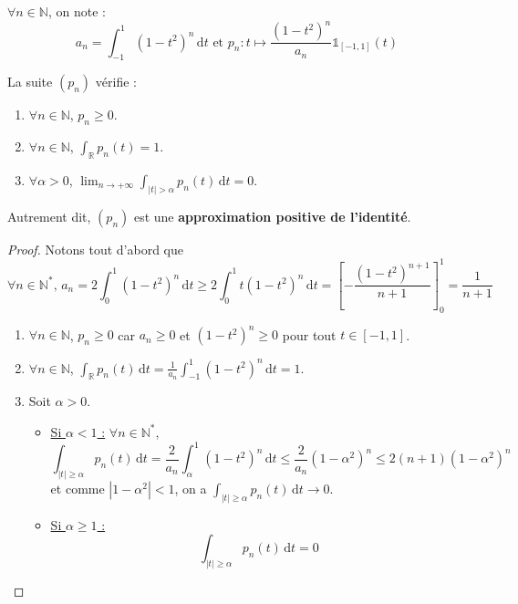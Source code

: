 






  \begin{notation}
    $\forall n \in \mathbb{N}$, on note :
    \[ a_n = \int_{-1}^1 (1-t^2)^n \, \mathrm{d}t \text{ et } p_n : t \mapsto \frac{(1-t^2)^n}{a_n} \mathbb{1}_{[-1, 1]}(t) \]
  \end{notation}

  \begin{lemma}
    \label{theoreme-de-weierstrass-par-la-convolution-1}
    La suite $(p_n)$ vérifie :
    \begin{enumerate}[label=(\roman*)]
      \item $\forall n \in \mathbb{N}$, $p_n \geq 0$.
      \item $\forall n \in \mathbb{N}$, $\int_{\mathbb{R}} p_n(t) = 1$.
      \item \label{theoreme-de-weierstrass-par-la-convolution-2} $\forall \alpha > 0$, $\lim_{n \rightarrow +\infty} \int_{|t| > \alpha} p_n(t) \, \mathrm{d}t = 0$.
    \end{enumerate}
    Autrement dit, $(p_n)$ est une \textbf{approximation positive de l'identité}.
  \end{lemma}

  \begin{proof}
    Notons tout d'abord que
    \[ \forall n \in \mathbb{N}^*, \, a_n = 2 \int_0^1 (1-t^2)^n \, \mathrm{d}t \geq 2 \int_0^1 t (1-t^2)^n \, \mathrm{d}t = \left[ - \frac{(1-t^2)^{n+1}}{n+1} \right]_0^1 = \frac{1}{n+1}  \]
    \begin{enumerate}[label=(\roman*)]
      \item $\forall n \in \mathbb{N}$, $p_n \geq 0$ car $a_n \geq 0$ et $(1-t^2)^n \geq 0$ pour tout $t \in [-1, 1]$.
      \item $\forall n \in \mathbb{N}$, $\int_{\mathbb{R}} p_n(t) \, \mathrm{d}t = \frac{1}{a_n} \int_{-1}^1 (1-t^2)^n \, \mathrm{d}t = 1$.
      \item Soit $\alpha > 0$.
      \begin{itemize}
        \item \uline{Si $\alpha < 1$ :} $\forall n \in \mathbb{N}^*$,
        \[ \int_{|t| \geq \alpha} p_n(t) \, \mathrm{d}t = \frac{2}{a_n} \int_\alpha^1 (1-t^2)^n \, \mathrm{d}t \leq \frac{2}{a_n} (1-\alpha^2)^n \leq 2(n+1)(1-\alpha^2)^n \]
        et comme $|1-\alpha^2| < 1$, on a $\int_{|t| \geq \alpha} p_n(t) \, \mathrm{d}t \longrightarrow 0$.
        \item \uline{Si $\alpha \geq 1$ :}
        \[ \int_{|t| \geq \alpha} p_n(t) \, \mathrm{d}t = 0 \]
      \end{itemize}
    \end{enumerate}
  \end{proof}

